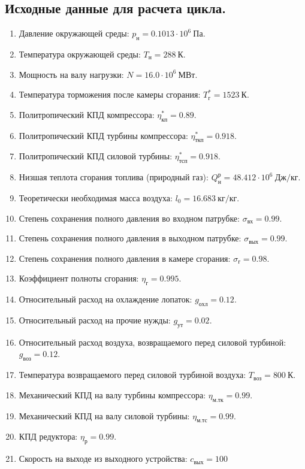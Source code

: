 \documentclass[a4paper,12pt]{article}
\begin{document}
    \subsection{Исходные данные для расчета цикла.}
%    
\begin{enumerate}

	\item Давление окружающей среды: $p_{н} = 0.1013 \cdot 10^6\ Па$.
	\item Температура окружающей среды: $T_{н} = 288\ К$.
	\item Мощность на валу нагрузки: $ N = 16.0 \cdot 10^6\ МВт $.
	\item Температура торможения после камеры сгорания: $T_г^* = 1523\ К$.
	\item Политропический КПД компрессора: $\eta^*_{к п} = 0.89 $.
	\item Политропический КПД турбины компрессора: $\eta^*_{ткп} = 0.918$.
	\item Политропический КПД силовой турбины: $\eta^*_{тсп} = 0.918$.
	\item Низшая теплота сгорания топлива (природный газ): $Q^р_н = 48.412 \cdot 10^6\ Дж/кг$.
	\item Теоретически необходимая масса воздуха: $l_0 = 16.683\ кг/кг$.

	\item Степень сохранения полного давления во входном патрубке: $\sigma_{вх} = 0.99$.
	\item Степень сохранения полного давления в выходном патрубке: $\sigma_{вых} = 0.99$.
	\item Степень сохранения полного давления в камере сгорания: $\sigma_г = 0.98$.
	\item Коэффициент полноты сгорания: $\eta_г = 0.995 $.
	\item Относительный расход на охлаждение лопаток: $g_{охл} = 0.12$.
	\item Относительный расход на прочие нужды: $g_{ут} = 0.02$.
	\item Относительный расход воздуха, возвращаемого перед силовой турбиной: $g_{воз} = 0.12$.
	\item Температура возвращаемого перед силовой турбиной воздуха: $T_{воз} = 800\ К$.
	\item Механический КПД на валу турбины компрессора: $\eta_{м.тк} = 0.99$.
	\item Механический КПД на валу силовой турбины: $\eta_{м.тс} = 0.99$.
	\item КПД редуктора: $ \eta_р = 0.99$.
	\item Скорость на выходе из выходного устройства: $ c_{вых} = 100 $

\end{enumerate}
\end{document}
